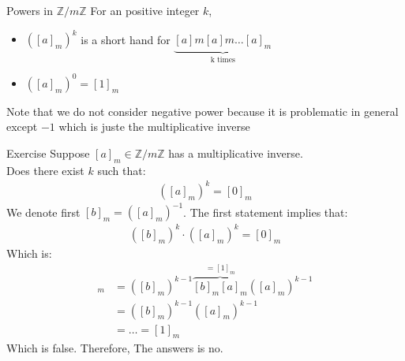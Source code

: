 \begin{parag}{Powers in $ \mathbb{Z}/ m \mathbb{Z}$}
    For an positive integer $k$,
    \begin{itemize}
        \item $([a]_m)^k$ is a short hand for $ \underbrace{[a]m[a]m \dots[a]_m}_{ \text{k times}}$
        \item $([a]_m)^0 = [1]_m$
    \end{itemize}
    Note that we do not consider negative power because it is problematic in general except $-1$ which is juste the multiplicative inverse

\end{parag}


\begin{parag}{Exercise}
    Suppose $[a]_m \in \mathbb{Z} / m \mathbb{Z}$ has a multiplicative inverse.\\
    Does there exist $k$ such that:
    \begin{align*}
        ([a]_m)^k = [0]_m
    \end{align*}
    We denote first $[b]_m = ([a]_m)^{-1}$. The first statement implies that:
    \begin{align*}
        ([b]_m)^k \cdot ([a]_m)^k = [0]_m
    \end{align*}
    Which is:
    \begin{align*}
        [0]_m &= ([b]_m)^{k-1} \overbrace{[b]_m[a]_m}^{= [1]_m} ([a]_m)^{k-1}\\
        &=([b]_m)^{k-1}([a]_m)^{k-1}\\
        &= \dots = [1]_m
    \end{align*}
    Which is false. Therefore, The answers is no.
\end{parag}
